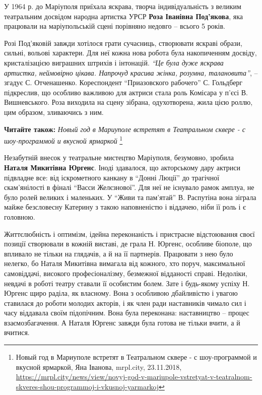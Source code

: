 У 1964 р. до Маріуполя приїхала яскрава, творча індивідуальність з великим
театральним досвідом народна артистка УРСР \textbf{Роза Іванівна Под'якова}, яка
працювали на маріупольській сцені порівняно недовго – всього 5 років.

Розі Под'яковій завжди хотілося грати сучасниць, створювати яскраві образи,
сильні, вольові характери. Для неї кожна нова робота була накопиченням досвіду,
кристалізацією виграшних штрихів і інтонацій. \emph{\enquote{Це була дуже яскрава артистка,
неймовірно цікава. Напрочуд красива жінка, розумна, талановита}}, – згадує С.
Отченашенко. Кореспондент \enquote{Приазовского рабочего} С. Гольдберг підкреслив, що
особливо важливою для актриси стала роль Комісара у п'єсі В. Вишневського. Роза
виходила на сцену зібрана, одухотворена, жила цією роллю, цим образом,
зливаючись з ним.


\textbf{Читайте також:} \emph{Новый год в Мариуполе встретят в Театральном сквере - с шоу-программой и вкусной ярмаркой}%
\footnote{Новый год в Мариуполе встретят в Театральном сквере - с шоу-программой и вкусной ярмаркой, Яна Іванова, mrpl.city, 23.11.2018, \url{https://mrpl.city/news/view/novyj-god-v-mariupole-vstretyat-v-teatralnom-skveres-shou-programmoj-i-vkusnoj-yarmarkoj}}

Незабутній внесок у театральне мистецтво Маріуполя, безумовно, зробила \textbf{Наталя
Микитівна Юргенс}. Іноді здавалося, що акторському дару актриси підвладне все:
від іскрометного канкану в \enquote{Донні Люції} до трагічної скам'янілості в фіналі
\enquote{Васси Желєзнової}. Для неї не існувало рамок амплуа, не було ролей великих і
маленьких. У \enquote{Живи та пам'ятай} В. Распутіна вона зіграла майже безсловесну
Катерину з такою наповненістю і віддачею, ніби її роль і є головною.


Життєлюбність і оптимізм, ідейна переконаність і пристрасне відстоювання своєї
позиції створювали в кожній виставі, де грала Н. Юргенс, особливе біополе, що
впливало не тільки на глядачів, а й на її партнерів. Працювати з нею було
нелегко, бо Наталя Микитівна вимагала від кожного, хто поруч, максимальної
самовіддачі, високого професіоналізму, безмежної відданості справі. Недоліки,
невдачі в роботі театру ставали її особистим болем. Зате і будь-якому успіху Н.
Юргенс щиро раділа, як власному. Вона з особливою дбайливістю і увагою
ставилася до роботи молодих акторів, і як член ради наставників чимало сил і
часу віддавала своїм підопічним. Вона була переконана: наставництво – процес
взаємозбагачення. А Наталя Юргенс завжди була готова не тільки вчити, а й
вчитися.

